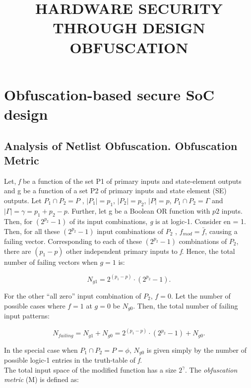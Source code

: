 \documentclass{optica-article}
\begin{document}
\begin{titlepage}
    \title{HARDWARE SECURITY THROUGH DESIGN OBFUSCATION}
    \date{}
    \maketitle
    \tableofcontents
\end{titlepage}

\section{Obfuscation-based secure SoC design}

\subsection{Analysis of Netlist Obfuscation. Obfuscation Metric}

Let, \textit{f} be a function of the set P1 of primary inputs and state-element outputs and g be a function of a set P2 of primary inputs and state element (SE) outputs. Let $P_1 \cap P_2 = P$ , $|P_1| = p_1$, $|P_2| = p_2$, $|P| = p$, $P_1 \cap P_2 = \Gamma$ and $|\Gamma| = \gamma = p_1 + p_2 − p$. Further, let g be a Boolean OR function with $p2$ inputs. Then, for $(2^{p_2} - 1)$ of its input combinations, \textit{g} is at logic-1. Consider en = 1. Then, for all these $(2^{p_2} - 1)$ input combinations of $P_2$ , $f_{mod} = \bar{f}$, causing a failing vector. Corresponding to each of these $(2^{p_2} - 1)$ combinations of $P_2$, there are $(p_1 - p)$ other independent primary inputs to \textit{f}. Hence, the total number of failing vectors when $g = 1$ is:

\begin{equation}
    \label{equation:1}
    N_{g1}= 2^{(p_1- p)}\cdot(2^{p_2} - 1).
\end{equation}

\indent For the other “all zero” input combination of $P_2$, $f = 0$. Let the number of possible cases where $f = 1$ at $g = 0$ be $N_{g0}$. Then, the total number of failing input patterns:

\begin{equation}
    \label{equation:2}
    N_{failing}= N_{g1}+N_{g0}=2^{(p_1- p)}\cdot(2^{p_2} - 1)+N_{g0}.
\end{equation}

\indent In the special case when $P_1 \cap P_2  = P = \phi$, $N_{g0}$ is given simply by the number of possible logic-1 entries in the truth-table of \textit{f}.\\
\indent The total input space of the modified function has a size $2^\gamma$. The \textit{obfuscation metric} (M) is defined as:
\end{document}

